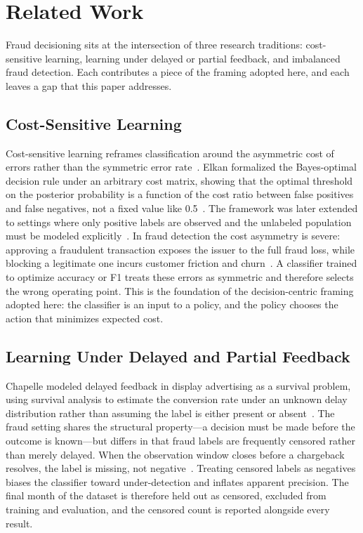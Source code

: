 \documentclass[conference]{IEEEtran}
\begin{document}
\section{Related Work}

Fraud decisioning sits at the intersection of three research traditions:
cost-sensitive learning, learning under delayed or partial feedback, and
imbalanced fraud detection. Each contributes a piece of the framing adopted
here, and each leaves a gap that this paper addresses.

\subsection{Cost-Sensitive Learning}

Cost-sensitive learning reframes classification around the asymmetric cost
of errors rather than the symmetric error rate~\cite{elkan2001}. Elkan
formalized the Bayes-optimal decision rule under an arbitrary cost matrix,
showing that the optimal threshold on the posterior probability is a
function of the cost ratio between false positives and false negatives, not
a fixed value like 0.5~\cite{elkan2001}. The framework was later extended
to settings where only positive labels are observed and the unlabeled
population must be modeled explicitly~\cite{elkan2008}. In fraud detection
the cost asymmetry is severe: approving a fraudulent transaction exposes
the issuer to the full fraud loss, while blocking a legitimate one incurs
customer friction and churn~\cite{elkan2001,dalpozzolo2015}. A classifier
trained to optimize accuracy or F1 treats these errors as symmetric and
therefore selects the wrong operating point. This is the foundation of the
decision-centric framing adopted here: the classifier is an input to a
policy, and the policy chooses the action that minimizes expected cost.

\subsection{Learning Under Delayed and Partial Feedback}

Chapelle modeled delayed feedback in display advertising as a survival
problem, using survival analysis to estimate the conversion rate under an
unknown delay distribution rather than assuming the label is either present
or absent~\cite{chapelle2014}. The fraud setting shares the structural
property---a decision must be made before the outcome is known---but
differs in that fraud labels are frequently censored rather than merely
delayed. When the observation window closes before a chargeback resolves,
the label is missing, not negative~\cite{jesus2022}. Treating censored
labels as negatives biases the classifier toward under-detection and
inflates apparent precision. The final month of the dataset is therefore
held out as censored, excluded from training and evaluation, and the
censored count is reported alongside every result.
\end{document}
